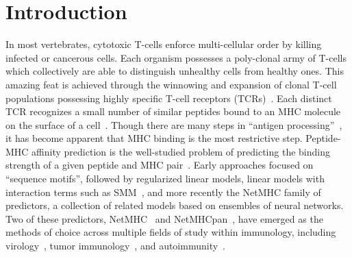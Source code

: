 \section{Introduction}

In most vertebrates, cytotoxic T-cells enforce multi-cellular order by killing infected or cancerous cells. Each organism possesses a poly-clonal army of T-cells which collectively are able to distinguish unhealthy cells from healthy ones. This amazing feat is achieved through the winnowing and expansion of clonal T-cell populations possessing highly specific T-cell receptors (TCRs)~\cite{Blackman_1990}. Each distinct TCR recognizes a small number of similar peptides bound to an MHC molecule on the surface of a cell~\cite{Huseby_2005}. Though there are many steps in ``antigen processing''~\cite{Cresswell_2005}, it has become apparent that MHC binding is the most restrictive step. Peptide-MHC affinity prediction is the well-studied problem of predicting the binding strength of a given peptide and MHC pair~\cite{Lundegaard_2007}. Early approaches focused on ``sequence motifs''\cite{Sette_1989}, followed by regularized linear models, linear models with interaction terms such as SMM~\cite{Peters_2003}, and more recently the NetMHC family of predictors, a collection of related models based on ensembles of neural networks. Two of these predictors, NetMHC~\cite{Lundegaard_2008} and NetMHCpan~\cite{Nielsen_2007}, have emerged as the methods of choice across multiple fields of study within immunology, including virology~\cite{Lund_2011}, tumor immunology~\cite{Gubin_2015}, and autoimmunity~\cite{Abreu_2012}. 


